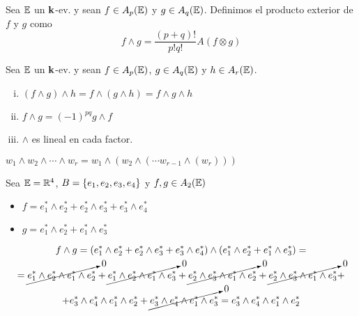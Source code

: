 \begin{defi}
	Sea $\mathbb{E}$ un $\mathbf{k}$-ev. y sean $f \in A_p(\mathbb{E})$ y $g \in A_q(\mathbb{E})$. Definimos el
	producto exterior de $f$ y $g$ como
	\[
		f \wedge g = \frac{(p+q)!}{p!q!}A(f \otimes g)
	\]
\end{defi}
\begin{prop}
	Sea $\mathbb{E}$ un $\mathbf{k}$-ev. y sean $f \in A_p(\mathbb{E})$, $g \in A_q(\mathbb{E})$ y $h \in A_r(\mathbb{E})$.
	\begin{enumerate}[i)]
		\item $(f \wedge g) \wedge h = f \wedge (g \wedge h) = f \wedge g \wedge h$
		\item $f \wedge g = (-1)^{pq} g \wedge f$
		\item $\wedge$ es lineal en cada factor.
	\end{enumerate}
\end{prop}
\begin{obs}
	$w_1 \wedge w_2 \wedge \cdots \wedge w_r = w_1 \wedge (w_2 \wedge (
	\cdots w_{r-1} \wedge (w_r)))$
\end{obs}
\begin{example}
	Sea $\mathbb{E} = \mathbb{R} ^4$, $B = \left\{e_1,e_2,e_3,e_4\right\}$ y $f,g \in A_2(\mathbb{E})$
	\begin{itemize}
		\item $f = e_1^* \wedge e_2^* + e_2^* \wedge e_3^* + e_3^* \wedge e_4^*$
		\item $g = e_1^* \wedge e_2^* + e_1^* \wedge e_3^*$
	\end{itemize}
	\begin{gather*}
		f \wedge g = (e_1^* \wedge e_2^* + e_2^* \wedge e_3^* + e_3^* \wedge e_4^*)
		\wedge (e_1^* \wedge e_2^* + e_1^* \wedge e_3^*) = \\
		 = \cancelto{0}{e_1^* \wedge e_2^* \wedge e_1^* \wedge e_2^*} + 
		 \cancelto{0}{e_1^* \wedge e_2^* \wedge e_1^* \wedge e_3^*} +
		 \cancelto{0}{e_2^* \wedge e_3^* \wedge e_1^* \wedge e_2^*} +
		 \cancelto{0}{e_2^* \wedge e_3^* \wedge e_1^* \wedge e_3^*} + \\
		 + e_3^* \wedge e_4^* \wedge e_1^* \wedge e_2^* +
		 \cancelto{0}{e_3^* \wedge e_4^* \wedge e_1^* \wedge e_3^*} =
		 e_3^* \wedge e_4^* \wedge e_1^* \wedge e_2^*
	\end{gather*}
\end{example}
